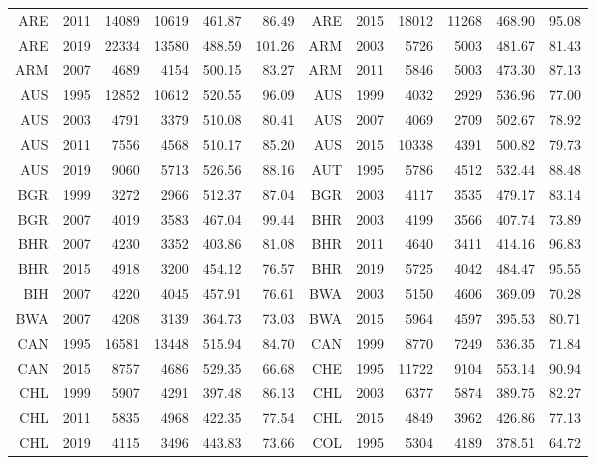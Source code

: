 {\begin{longtable}{r|r|r|r|r|r||r|r|r|r|r|r}
\hline \hline
\endlastfoot
    ARE   & 2011  & 14089 & 10619 & 461.87 & 86.49  & ARE   & 2015  & 18012 & 11268 & 468.90 & 95.08 \\
    ARE   & 2019  & 22334 & 13580 & 488.59 & 101.26 & ARM   & 2003  & 5726  & 5003  & 481.67 & 81.43 \\
    ARM   & 2007  & 4689  & 4154  & 500.15 & 83.27  & ARM   & 2011  & 5846  & 5003  & 473.30 & 87.13 \\
    AUS   & 1995  & 12852 & 10612 & 520.55 & 96.09  & AUS   & 1999  & 4032  & 2929  & 536.96 & 77.00 \\
    AUS   & 2003  & 4791  & 3379  & 510.08 & 80.41  & AUS   & 2007  & 4069  & 2709  & 502.67 & 78.92 \\
    AUS   & 2011  & 7556  & 4568  & 510.17 & 85.20  & AUS   & 2015  & 10338 & 4391  & 500.82 & 79.73 \\
    AUS   & 2019  & 9060  & 5713  & 526.56 & 88.16  & AUT   & 1995  & 5786  & 4512  & 532.44 & 88.48 \\
    BGR   & 1999  & 3272  & 2966  & 512.37 & 87.04  & BGR   & 2003  & 4117  & 3535  & 479.17 & 83.14 \\
    BGR   & 2007  & 4019  & 3583  & 467.04 & 99.44  & BHR   & 2003  & 4199  & 3566  & 407.74 & 73.89 \\
    BHR   & 2007  & 4230  & 3352  & 403.86 & 81.08  & BHR   & 2011  & 4640  & 3411  & 414.16 & 96.83 \\
    BHR   & 2015  & 4918  & 3200  & 454.12 & 76.57  & BHR   & 2019  & 5725  & 4042  & 484.47 & 95.55 \\
    BIH   & 2007  & 4220  & 4045  & 457.91 & 76.61  & BWA   & 2003  & 5150  & 4606  & 369.09 & 70.28 \\
    BWA   & 2007  & 4208  & 3139  & 364.73 & 73.03  & BWA   & 2015  & 5964  & 4597  & 395.53 & 80.71 \\
    CAN   & 1995  & 16581 & 13448 & 515.94 & 84.70  & CAN   & 1999  & 8770  & 7249  & 536.35 & 71.84 \\
    CAN   & 2015  & 8757  & 4686  & 529.35 & 66.68  & CHE   & 1995  & 11722 & 9104  & 553.14 & 90.94 \\
    CHL   & 1999  & 5907  & 4291  & 397.48 & 86.13  & CHL   & 2003  & 6377  & 5874  & 389.75 & 82.27 \\
    CHL   & 2011  & 5835  & 4968  & 422.35 & 77.54  & CHL   & 2015  & 4849  & 3962  & 426.86 & 77.13 \\
    CHL   & 2019  & 4115  & 3496  & 443.83 & 73.66  & COL   & 1995  & 5304  & 4189  & 378.51 & 64.72 \\

\end{longtable}}
